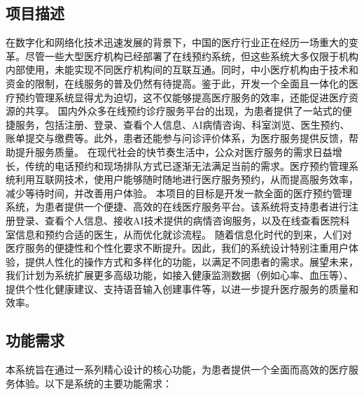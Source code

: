 \subsection{项目描述}
在数字化和网络化技术迅速发展的背景下，中国的医疗行业正在经历一场重大的变革。尽管一些大型医疗机构已经部署了在线预约系统，但这些系统大多仅限于机构内部使用，未能实现不同医疗机构间的互联互通。同时，中小医疗机构由于技术和资金的限制，在线服务的普及仍然有待提高。鉴于此，开发一个全面且一体化的医疗预约管理系统显得尤为迫切，这不仅能够提高医疗服务的效率，还能促进医疗资源的共享。
国内外众多在线预约诊疗服务平台的出现，为患者提供了一站式的便捷服务，包括注册、登录、查看个人信息、AI病情咨询、科室浏览、医生预约、账单提交与缴费等。此外，患者还能参与问诊评价体系，为医疗服务提供反馈，帮助提升服务质量。
在现代社会的快节奏生活中，公众对医疗服务的需求日益增长，传统的电话预约和现场排队方式已逐渐无法满足当前的需求。医疗预约管理系统利用互联网技术，使用户能够随时随地进行医疗服务预约，从而提高服务效率，减少等待时间，并改善用户体验。
本项目的目标是开发一款全面的医疗预约管理系统，为患者提供一个便捷、高效的在线医疗服务平台。该系统将支持患者进行注册登录、查看个人信息、接收AI技术提供的病情咨询服务，以及在线查看医院科室信息和预约合适的医生，从而优化就诊流程。
随着信息化时代的到来，人们对医疗服务的便捷性和个性化要求不断提升。因此，我们的系统设计特别注重用户体验，提供人性化的操作方式和多样化的功能，以满足不同患者的需求。展望未来，我们计划为系统扩展更多高级功能，如接入健康监测数据（例如心率、血压等）、提供个性化健康建议、支持语音输入创建事件等，以进一步提升医疗服务的质量和效率。

\subsection{功能需求}
本系统旨在通过一系列精心设计的核心功能，为患者提供一个全面而高效的医疗服务体验。以下是系统的主要功能需求：

